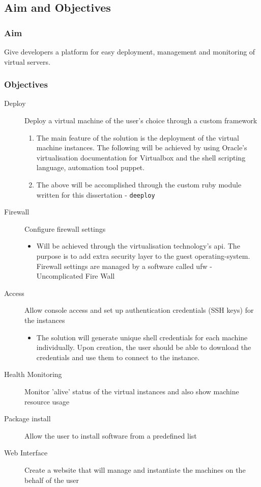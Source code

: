 \documentclass{article}
\begin{document}
\subsection{Aim and Objectives}
\subsubsection{Aim}
Give developers a platform for easy deployment, management and monitoring of virtual servers.
\subsubsection{Objectives}

\begin{description}
    \item[Deploy\label{itm:deploy}]Deploy a virtual machine of the user's choice through a custom framework
          \begin{enumerate}
              \item The main feature of the solution is the deployment of the virtual machine instances. The following will be achieved by using Oracle's virtualisation documentation for Virtualbox and the shell scripting language, automation tool \gls{puppet}.
              \item The above will be accomplished through the custom ruby module written for this dissertation - \texttt{deeploy}
          \end{enumerate}

    \item[Firewall\label{itm:firewall}]Configure firewall settings
          \begin{itemize}
              \item Will be achieved through the virtualisation technology's \gls{api}. The purpose is to add extra security layer to the guest \gls{operating-system}. Firewall settings are managed by a software called ufw - Uncomplicated Fire Wall
          \end{itemize}

    \item[Access\label{itm:access}]Allow console access and set up authentication credentials (SSH keys) for the instances
          \begin{itemize}
              \item The solution will generate unique shell credentials for each machine individually. Upon creation, the user should be able to download the credentials and use them to connect to the instance.
          \end{itemize}
    \item[Health Monitoring\label{itm:healthmonitor}]Monitor 'alive' status of the virtual instances and also show machine resource usage
    \item[Package install\label{itm:packages}]Allow the user to install software from a predefined list
    \item[Web Interface\label{itm:website}]Create a website that will manage and instantiate the machines on the behalf of the user
\end{description}
\end{document}
